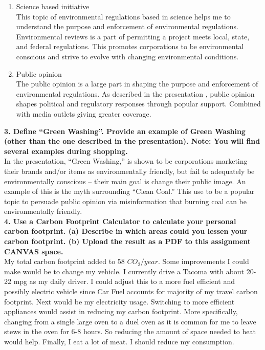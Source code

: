 \documentclass[12pt]{article}
\begin{document}
\begin{enumerate}
    \item Science based initiative \\
    This topic of environmental regulations based in science helps me to understand the purpose and enforcement of environmental regulations. Environmental reviews is a part of permitting a project meets local, state, and federal regulations. This promotes corporations to be environmental conscious and strive to evolve with changing environmental conditions.
    
    \item Public opinion \\
    The public opinion is a large part in shaping the purpose and enforcement of environmental regulations. As described in the presentation \cite{ESG_Reflection}, public opinion shapes political and regulatory responses through popular support. Combined with media outlets giving greater coverage.
\end{enumerate}

\textbf{3. Define ``Green Washing''.  Provide an example of Green Washing (other than the one described in the presentation).  Note:  You will find several examples during shopping.} \\

 In the presentation, ``Green Washing,'' is shown to be corporations marketing their brands and/or items as environmentally friendly, but fail to adequately be environmentally conscious -- their main goal is change their public image. An example of this is the myth surrounding ``Clean Coal.'' This use to be a popular topic to persuade public opinion via misinformation that burning coal can be environmentally friendly. \\
 
 \textbf{4. Use a Carbon Footprint Calculator to calculate your personal carbon footprint. (a)  Describe in which areas could you lessen your carbon footprint.  (b) Upload the result as a PDF to this assignment CANVAS space.} \\
 
 My total carbon footprint added to 58 $CO_2/year$. Some improvements I could make would be to change my vehicle. I currently drive a Tacoma with about 20-22 mpg as my daily driver. I could adjust this to a more fuel efficient and possibly electric vehicle since Car Fuel accounts for majority of my travel carbon footprint. Next would be my electricity usage. Switching to more efficient appliances would assist in reducing my carbon footprint. More specifically, changing from a single large oven to a duel oven as it is common for me to leave stews in the oven for 6-8 hours. So reducing the amount of space needed to heat would help. Finally, I eat a lot of meat. I should reduce my consumption. 
 
\end{document}
